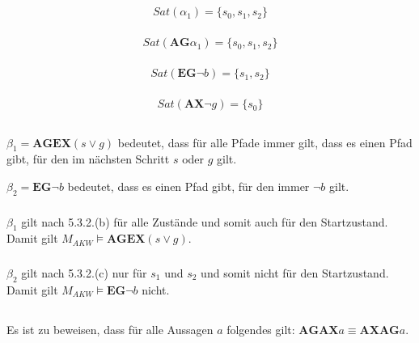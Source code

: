 \documentclass[10pt,a4paper,oneside,ngerman,numbers=noenddot]{scrartcl}
\begin{document}
	\subsection{}
		\subsubsection{}
		\[Sat(\alpha _{1}) = \{s_{0},s_{1},s_{2}\}\]
		\subsubsection{}
		\[Sat(\textbf{AG}\alpha _{1}) = \{s_{0},s_{1},s_{2}\}\]
		\subsubsection{}
		\[Sat(\textbf{EG}\lnot b) = \{s_{1},s_{2}\} \]
		\subsubsection{}
		\[Sat(\textbf{AX}\lnot g) = \{s_{0}\} \]
	\subsection{}
	\(\beta _{1} = \textbf{AGEX}(s \vee g)\) bedeutet, dass für alle Pfade immer gilt, dass es einen Pfad gibt, für den im nächsten Schritt \(s\) oder \(g\) gilt.
	
	\(\beta _{2} = \textbf{EG}\lnot b\) bedeutet, dass es einen Pfad gibt, für den immer \(\lnot b\) gilt.
		
		\subsubsection{}
		\(\beta _{1}\) gilt nach 5.3.2.(b) für alle Zustände und somit auch für den Startzustand. Damit gilt \(M_{AKW} \models \textbf{AGEX}(s \vee g)\).
		\subsubsection{}
		\(\beta _{2}\) gilt nach 5.3.2.(c) nur für \(s_{1}\) und \(s_{2}\) und somit nicht für den Startzustand. Damit gilt \(M_{AKW} \models \textbf{EG}\lnot b\) nicht.
	
	\subsection{}
	\subsubsection{}
	Es ist zu beweisen, dass für alle Aussagen \(a\) folgendes gilt: \(\textbf{AGAX}a \equiv \textbf{AXAG}a\).
	
\end{document}
